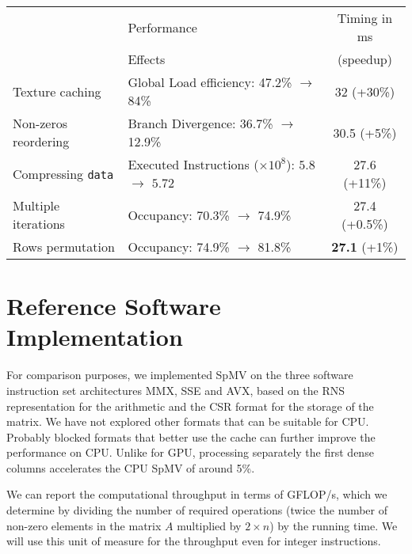 \documentclass[runningheads,orivec]{llncs}
\begin{document}
	\begin{center}
    \begin{tabular}{|l||l|c|}
      \hline
      & \footnotesize Performance & \footnotesize Timing in ms \\
      & \footnotesize Effects & \footnotesize (speedup) \\
      \hline
      \hline
      {\footnotesize Texture caching} & {\footnotesize Global Load efficiency: 47.2\% $\rightarrow$ 84\%} & \footnotesize 32 (+30\%)\\
      \hline
      {\footnotesize Non-zeros reordering} & {\footnotesize Branch Divergence: 36.7\% $\rightarrow$ 12.9\%} & \footnotesize 30.5 (+5\%)\\
      \hline
      {\footnotesize Compressing \texttt{data}} & {\footnotesize Executed Instructions ($\times 10^8$): $5.8 $ $\rightarrow$ $5.72$} & \footnotesize 27.6 (+11\%)\\
      \hline
      {\small Multiple iterations} & {\footnotesize Occupancy: 70.3\% $\rightarrow$ 74.9\%} & \footnotesize 27.4 (+0.5\%)\\
      \hline
      {\small Rows permutation} & {\footnotesize Occupancy: 74.9\% $\rightarrow$ 81.8\%} & \footnotesize \textbf{27.1} (+1\%)\\
      \hline
    \end{tabular}
\end{center}

\vspace*{-0.25cm}

\section{Reference Software Implementation}

\label{soft}
For comparison purposes, we implemented SpMV on the three software instruction set architectures MMX, SSE and AVX, based on the RNS representation for the arithmetic and the CSR format for the storage of the matrix. We have not explored other formats that can be suitable for CPU. Probably blocked formats that better use the cache can further improve the performance on CPU. Unlike for GPU, processing separately the first dense columns accelerates the CPU SpMV of around 5\%.


We can report the computational throughput in terms of GFLOP/s, which we determine by dividing the number of required operations (twice the number of non-zero elements in the matrix $A$ multiplied by $2\times n$) by the running time. We will use this unit of measure for the throughput even for integer instructions.
\end{document}
